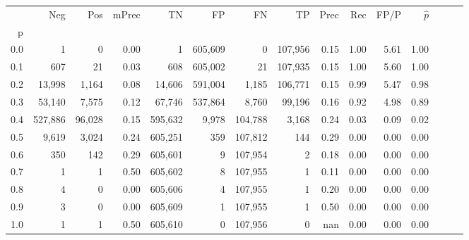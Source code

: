 \begin{tabular}{rrrrrrrrrrrrrrr}
\toprule
{} &      Neg &     Pos & mPrec &       TN &       FP &       FN &       TP &  Prec &   Rec &  FP/P & $\hat{p}$ \\
p   &          &         &       &          &          &          &          &       &       &       &           \\
\midrule
0.0 &        1 &       0 &  0.00 &        1 &  605,609 &        0 &  107,956 &  0.15 &  1.00 &  5.61 &      1.00 \\
0.1 &      607 &      21 &  0.03 &      608 &  605,002 &       21 &  107,935 &  0.15 &  1.00 &  5.60 &      1.00 \\
0.2 &   13,998 &   1,164 &  0.08 &   14,606 &  591,004 &    1,185 &  106,771 &  0.15 &  0.99 &  5.47 &      0.98 \\
0.3 &   53,140 &   7,575 &  0.12 &   67,746 &  537,864 &    8,760 &   99,196 &  0.16 &  0.92 &  4.98 &      0.89 \\
0.4 &  527,886 &  96,028 &  0.15 &  595,632 &    9,978 &  104,788 &    3,168 &  0.24 &  0.03 &  0.09 &      0.02 \\
0.5 &    9,619 &   3,024 &  0.24 &  605,251 &      359 &  107,812 &      144 &  0.29 &  0.00 &  0.00 &      0.00 \\
0.6 &      350 &     142 &  0.29 &  605,601 &        9 &  107,954 &        2 &  0.18 &  0.00 &  0.00 &      0.00 \\
0.7 &        1 &       1 &  0.50 &  605,602 &        8 &  107,955 &        1 &  0.11 &  0.00 &  0.00 &      0.00 \\
0.8 &        4 &       0 &  0.00 &  605,606 &        4 &  107,955 &        1 &  0.20 &  0.00 &  0.00 &      0.00 \\
0.9 &        3 &       0 &  0.00 &  605,609 &        1 &  107,955 &        1 &  0.50 &  0.00 &  0.00 &      0.00 \\
1.0 &        1 &       1 &  0.50 &  605,610 &        0 &  107,956 &        0 &   nan &  0.00 &  0.00 &      0.00 \\
\bottomrule
\end{tabular}
